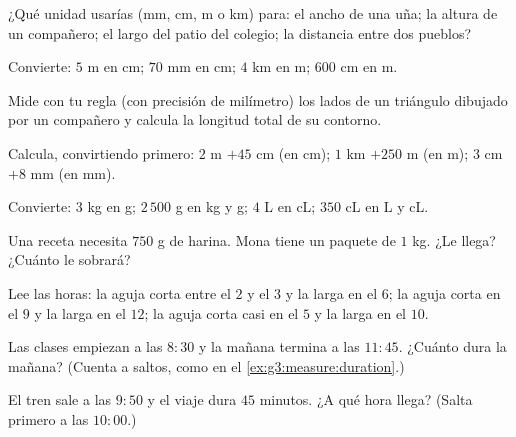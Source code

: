 \begin{exercise}[$\star$]\label{exo:g3:measure:1}
¿Qué unidad usarías (mm, cm, m o km) para: el ancho de una uña;
la altura de un compañero; el largo del patio del colegio; la
distancia entre dos pueblos?
\end{exercise}

\begin{exercise}[$\star$]\label{exo:g3:measure:2}
Convierte: $5$ m en cm; \quad $70$ mm en cm; \quad $4$ km en m;
\quad $600$ cm en m.
\end{exercise}

\begin{exercise}[$\star$]\label{exo:g3:measure:3}
Mide con tu regla (con precisión de milímetro) los lados de un
triángulo dibujado por un compañero y calcula la longitud total de su
contorno.
\end{exercise}

\begin{exercise}[$\star$]\label{exo:g3:measure:4}
Calcula, convirtiendo primero: $2$ m $+ 45$ cm (en cm); \quad
$1$ km $+ 250$ m (en m); \quad $3$ cm $+ 8$ mm (en mm).
\end{exercise}

\begin{exercise}[$\star$]\label{exo:g3:measure:5}
Convierte: $3$ kg en g; \quad $2\,500$ g en kg y g; \quad
$4$ L en cL; \quad $350$ cL en L y cL.
\end{exercise}

\begin{exercise}[$\star$]\label{exo:g3:measure:6}
Una receta necesita $750$ g de harina. Mona tiene un paquete de $1$ kg. ¿Le
llega? ¿Cuánto le sobrará?
\end{exercise}

\begin{exercise}[$\star$]\label{exo:g3:measure:7}
Lee las horas: la aguja corta entre el $2$ y el $3$ y la larga
en el $6$; la aguja corta en el $9$ y la larga en el $12$;
la aguja corta casi en el $5$ y la larga en el $10$.
\end{exercise}

\begin{exercise}[$\star$]\label{exo:g3:measure:8}
Las clases empiezan a las $8{:}30$ y la mañana termina a las $11{:}45$. ¿Cuánto
dura la mañana? (Cuenta a saltos, como en el
\cref{ex:g3:measure:duration}.)
\end{exercise}

\begin{exercise}[$\star$]\label{exo:g3:measure:9}
El tren sale a las $9{:}50$ y el viaje dura $45$ minutos. ¿A qué
hora llega? (Salta primero a las $10{:}00$.)
\end{exercise}

